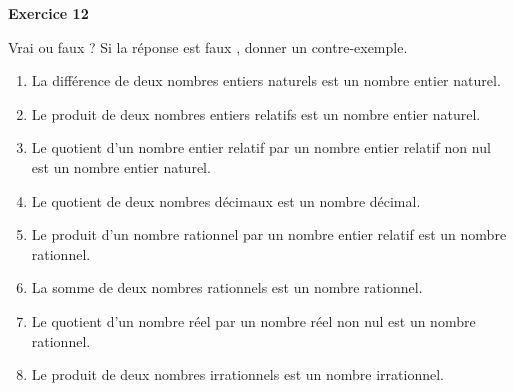\documentclass[a4paper,11pt]{article}
\newenvironment{exercice}[1]{%
  \Needspace{6\baselineskip}\par\bigskip\noindent\textbf{Exercice #1}\par\smallskip\noindent\ignorespaces
}{%
  \par
}
\begin{document}
\begin{exercice}{12}
Vrai ou faux ? Si la réponse est \og faux \fg{}, donner un contre-exemple.
\begin{enumerate}[label=\arabic*.]
\item La différence de deux nombres entiers naturels est un nombre entier naturel.
\item Le produit de deux nombres entiers relatifs est un nombre entier naturel.
\item Le quotient d'un nombre entier relatif par un nombre entier relatif non nul est un nombre entier naturel.
\item Le quotient de deux nombres décimaux est un nombre décimal.
\item Le produit d'un nombre rationnel par un nombre entier relatif est un nombre rationnel.
\item La somme de deux nombres rationnels est un nombre rationnel.
\item Le quotient d'un nombre réel par un nombre réel non nul est un nombre rationnel.
\item Le produit de deux nombres irrationnels est un nombre irrationnel.
\end{enumerate}
\end{exercice}
\end{document}
